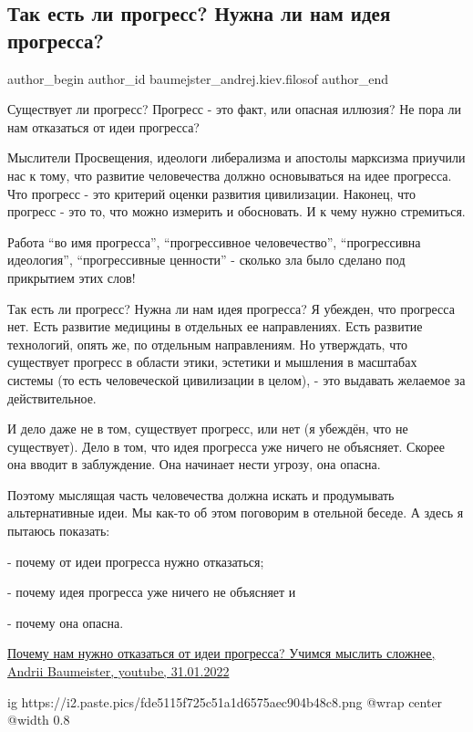  
 
 
 
 
 
\subsection{Так есть ли прогресс? Нужна ли нам идея прогресса?}
\label{sec:31_01_2022.fb.baumejster_andrej.kiev.filosof.1.progress}
 
\ifcmt
 author_begin
   author_id baumejster_andrej.kiev.filosof
 author_end
\fi

Существует ли прогресс? Прогресс - это факт, или опасная иллюзия? Не пора ли
нам отказаться от идеи прогресса? 

Мыслители Просвещения, идеологи либерализма и апостолы марксизма приучили нас к
тому, что развитие человечества должно основываться на идее прогресса. Что
прогресс - это критерий оценки развития цивилизации. Наконец, что прогресс -
это то, что можно измерить и обосновать. И к чему нужно стремиться.

Работа \enquote{во имя прогресса}, \enquote{прогрессивное человечество},
\enquote{прогрессивна идеология}, \enquote{прогрессивные ценности} - сколько
зла было сделано под прикрытием этих слов! 

Так есть ли прогресс? Нужна ли нам идея прогресса? Я убежден, что прогресса
нет. Есть развитие медицины в отдельных ее направлениях. Есть развитие
технологий, опять же, по отдельным направлениям. Но утверждать, что существует
прогресс в области этики, эстетики и мышления в масштабах системы (то есть
человеческой цивилизации в целом), - это выдавать желаемое за действительное.

И дело даже не в том, существует прогресс, или нет (я убеждён, что не
существует). Дело в том, что идея прогресса уже ничего не объясняет. Скорее она
вводит в заблуждение. Она начинает нести угрозу, она опасна.

Поэтому мыслящая часть человечества должна искать и продумывать альтернативные
идеи. Мы как-то об этом поговорим в отельной беседе. А здесь я пытаюсь
показать:

- почему от идеи прогресса нужно отказаться;

- почему идея прогресса уже ничего не объясняет и

- почему она опасна.

\href{https://www.youtube.com/watch?v=jER8tOk0-qU}{%
Почему нам нужно отказаться от идеи прогресса? Учимся мыслить сложнее, %
Andrii Baumeister, youtube, 31.01.2022%
}

\ifcmt
  ig https://i2.paste.pics/fde5115f725c51a1d6575aec904b48c8.png
  @wrap center
  @width 0.8
\fi
